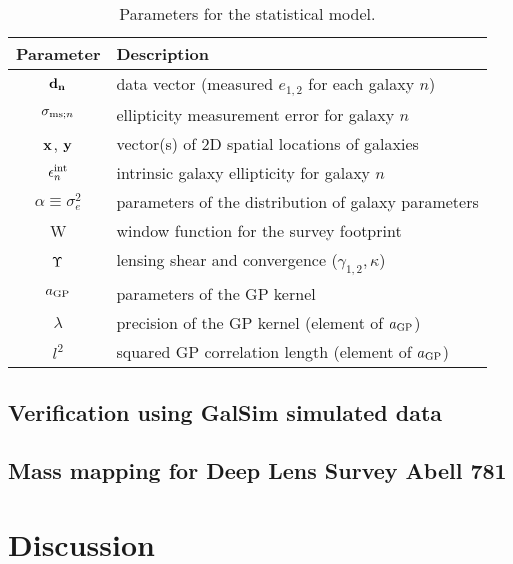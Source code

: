  
\begin{table}%
\begin{center}
\caption{Parameters for the statistical model.}
\label{tab:sampling_parameters}
\begin{tabular}{cl}
\hline
Parameter & Description \\
\hline
${\bf d_{n}}$ & data vector (measured $e_{1,2}$ for each galaxy $n$)  \\
$\sigma_{{\rm ms}; n}$ & ellipticity measurement error for galaxy $n$ 
\\
$\mathbf{x}$, $\mathbf{y}$ & vector(s) of 2D spatial locations of galaxies \\
$\epsilon_n^{\rm int}$ & intrinsic galaxy ellipticity for galaxy $n$ \\
$\alpha\equiv\sigma_{e}^2$ & parameters of the distribution of galaxy parameters \\
W & window function for the survey footprint \\
$\Upsilon$ & lensing shear and convergence ($\gamma_{1,2}, \kappa$) \\
$a_{\rm GP}$ & parameters of the GP kernel\\
$\lambda$ & precision of the GP kernel (element of $a_{\rm GP}$) \\
$l^2$ & squared GP correlation length (element of $a_{\rm GP}$) \\
\hline
\end{tabular}
\end{center}
\end{table}



\subsection{Verification using {\sc GalSim} simulated data}
\subsection{Mass mapping for Deep Lens Survey Abell 781}


\section{Discussion}

